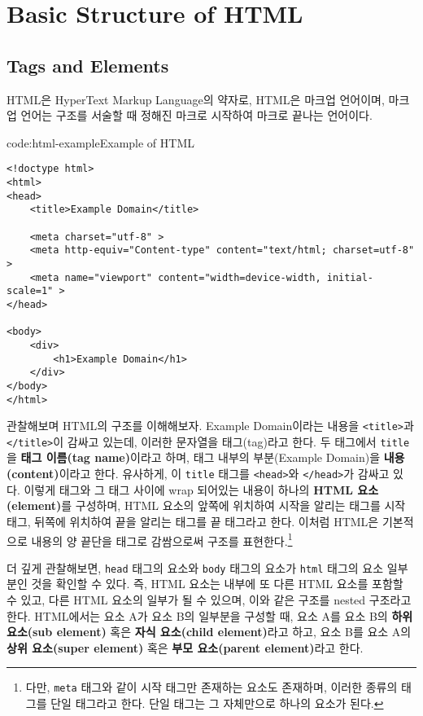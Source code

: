 \section{Basic Structure of HTML} \label{sect:basic-structure-of-html}

\subsection*{Tags and Elements}
HTML은 HyperText Markup Language의 약자로, HTML은 마크업 언어이며, 마크업 언어는 구조를 서술할 때 정해진 마크로 시작하여 마크로 끝나는 언어이다.

\begin{codeenv}{code:html-example}{Example of HTML}\begin{verbatim}
<!doctype html>
<html>
<head>
    <title>Example Domain</title>

    <meta charset="utf-8" >
    <meta http-equiv="Content-type" content="text/html; charset=utf-8" >
    <meta name="viewport" content="width=device-width, initial-scale=1" >
</head>

<body>
    <div>
        <h1>Example Domain</h1>
    </div>
</body>
</html>
\end{verbatim}
\end{codeenv}

\을 관찰해보며 HTML의 구조를 이해해보자. Example Domain이라는 내용을 \texttt{<title>}과 \texttt{</title>}이 감싸고 있는데, 이러한 문자열을 태그(tag)라고 한다. 두 태그에서 \texttt{title}을 \textbf{태그 이름(tag name)}이라고 하며, 태그 내부의 부분(Example Domain)을 \textbf{내용(content)}이라고 한다. 유사하게, 이 \texttt{title} 태그를 \texttt{<head>}와 \texttt{</head>}가 감싸고 있다. 이렇게 태그와 그 태그 사이에 wrap 되어있는 내용이 하나의 \textbf{HTML 요소(element)}를 구성하며, HTML 요소의 앞쪽에 위치하여 시작을 알리는 태그를 시작 태그, 뒤쪽에 위치하여 끝을 알리는 태그를 끝 태그라고 한다. 이처럼 HTML은 기본적으로 내용의 양 끝단을 태그로 감쌈으로써 구조를 표현한다.\footnote{다만, \texttt{meta} 태그와 같이 시작 태그만 존재하는 요소도 존재하며, 이러한 종류의 태그를 단일 태그라고 한다. 단일 태그는 그 자체만으로 하나의 요소가 된다.}

\을 더 깊게 관찰해보면, \texttt{head} 태그의 요소와 \texttt{body} 태그의 요소가 \texttt{html} 태그의 요소 일부분인 것을 확인할 수 있다. 즉, HTML 요소는 내부에 또 다른 HTML 요소를 포함할 수 있고, 다른 HTML 요소의 일부가 될 수 있으며, 이와 같은 구조를 nested 구조라고 한다. HTML에서는 요소 A가 요소 B의 일부분을 구성할 때, 요소 A를 요소 B의 \textbf{하위 요소(sub element)} 혹은 \textbf{자식 요소(child element)}라고 하고, 요소 B를 요소 A의 \textbf{상위 요소(super element)} 혹은 \textbf{부모 요소(parent element)}라고 한다.

